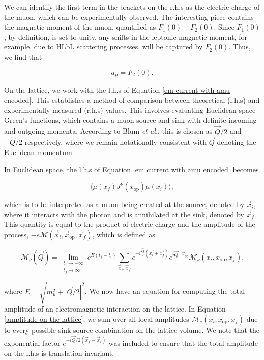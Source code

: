 \documentclass{article}
\numberwithin{equation}{section} %
\begin{document}
We can identify the first term in the brackets on the r.h.s as the electric charge\cite{zee} of the muon, which can be experimentally observed. The interesting piece contains the magnetic moment of the muon, quantified as $F_1(0) + F_2(0)$. Since $F_1(0)$, by definition, is set to unity, any shifts in the leptonic magnetic moment, for example, due to HLbL scattering processes, will be captured by $F_2(0)$. Thus, we find that \cite{blum}

\begin{equation}
a_\mu = F_2(0).
\end{equation}

On the lattice, we work with the l.h.s of Equation \ref{em current with amu encoded}. This establishes a method of comparison between theoretical (l.h.s) and experimentally measured (r.h.s) values. This involves evaluating Euclidean space Green's functions, which contains a muon source and sink with definite incoming and outgoing momenta. According to Blum \textit{et al.}\cite{blum}, this is chosen as $\vec{Q}/2$ and $-\vec{Q}/2$ respectively, where we remain notationally consistent with $\vec{Q}$ denoting the Euclidean momentum. 

In Euclidean space, the l.h.s of Equation \ref{em current with amu encoded} becomes

\begin{equation}
\langle \mu(x_f) J^\nu(x_\mathrm{op}) \bar{\mu}(x_i)\rangle,
\end{equation}

\noindent which is to be interpreted as a muon being created at the source, denoted by $\vec{x}_i$, where it interacts with the photon and is annihilated at the sink, denoted by $\vec{x}_f$. This quantity is equal to the product of electric charge and the amplitude of the process, $-e\mathcal{M}(\vec{x}_i,\vec{x}_\mathrm{op},\vec{x}_f)$, which is defined as

\begin{equation}
\mathcal{M}_\nu(\vec{Q}) = \lim_{\substack{t_i\rightarrow -\infty\\t_f \rightarrow \infty}} e^{E(t_f-t_i)} \sum_{\vec{x}_i,\vec{x}_f}e^{-i\frac{\vec{Q}}{2}(\vec{x_i}+\vec{x_f})}e^{i\vec{Q}\cdot\vec{x}_{op}} \mathcal{M}_\nu(x_i,x_\mathrm{op}, x_f).
\label{amplitude on the lattice}
\end{equation}

\noindent where $E=\sqrt{m_\mu^2+|\vec{Q}/2|^2}$. We now have an equation for computing the total amplitude of an electromagnetic interaction on the lattice. In Equation \ref{amplitude on the lattice}, we sum over all local amplitudes $\mathcal{M}_\nu(x_i,x_{\mathrm{op}},x_f)$ due to every possible sink-source combination on the lattice volume. We note that the exponential factor $e^{-i\vec{Q}/2(\vec{x}_f-\vec{x}_i)}$ was included to ensure that the total amplitude on the l.h.s is translation invariant. 
\end{document}
